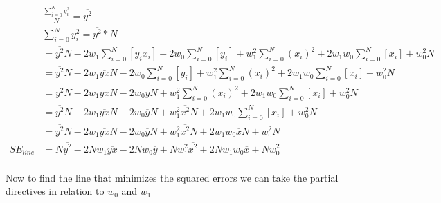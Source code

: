 \documentclass[10pt,a4paper]{article}
\newcommand*\mean[1]{\overline{#1}}
\begin{document}
		\begin{align*}
		&\frac{\sum_{i=0}^{N}{y_i^2}}{N}=\mean{y^2}\\
		&\sum_{i=0}^{N}{y_i^2}=\mean{y^2}*N
		\\
		&=\mean{y^2}N-2w_1\sum_{i=0}^{N}{[y_ix_i]}-2w_0\sum_{i=0}^{N}{[y_i]}+w_1^2\sum_{i=0}^{N}{(x_i)^2}+2w_1w_0\sum_{i=0}^{N}{[x_i]}+w_0^2N\\
		&=\mean{y^2}N-2w_1\mean{yx}N-2w_0\sum_{i=0}^{N}{[y_i]}+w_1^2\sum_{i=0}^{N}{(x_i)^2}+2w_1w_0\sum_{i=0}^{N}{[x_i]}+w_0^2N\\
		&=\mean{y^2}N-2w_1\mean{yx}N-2w_0\mean{y}N+w_1^2\sum_{i=0}^{N}{(x_i)^2}+2w_1w_0\sum_{i=0}^{N}{[x_i]}+w_0^2N\\
		&=\mean{y^2}N-2w_1\mean{yx}N-2w_0\mean{y}N+w_1^2\mean{x^2}N+2w_1w_0\sum_{i=0}^{N}{[x_i]}+w_0^2N\\
		&=\mean{y^2}N-2w_1\mean{yx}N-2w_0\mean{y}N+w_1^2\mean{x^2}N+2w_1w_0\mean{x}N+w_0^2N\\
		SE_{line}&=N\mean{y^2}-2Nw_1\mean{yx}-2Nw_0\mean{y}+Nw_1^2\mean{x^2}+2Nw_1w_0\mean{x}+Nw_0^2\\	
	\end{align*}
	
	
	Now to find the line that minimizes the squared errors we can take the partial directives in relation to $w_0$ and $w_1$
	
\end{document}
